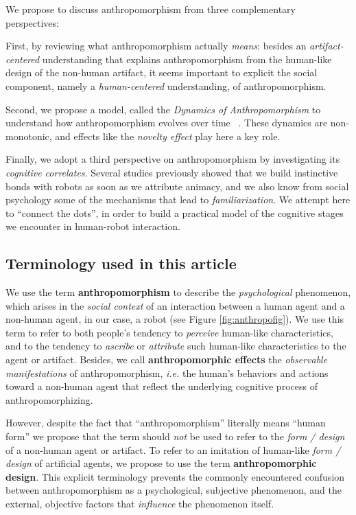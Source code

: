 \documentclass{frontiersSCNS} %
\newcommand{\ie}{\textit{i.e.}\xspace}
\begin{document}
We propose to discuss anthropomorphism from three complementary perspectives: 

First, by reviewing what anthropomorphism actually \emph{means}: besides an
\emph{artifact-centered} understanding that explains anthropomorphism from the
human-like design of the non-human artifact, it seems important to explicit the
social component, namely a \emph{human-centered} understanding, of
anthropomorphism.

Second, we propose a model, called the \textit{Dynamics of Anthropomorphism} to
understand how anthropomorphism evolves over time
~\citep{lemaignan2014dynamics}.  These dynamics are non-monotonic, and effects
like the \emph{novelty effect} play here a key role.

Finally, we adopt a third perspective on anthropomorphism by investigating its
\emph{cognitive correlates}. Several studies previously showed that we build
instinctive bonds with robots as soon as we attribute animacy, and we also know
from social psychology some of the mechanisms that lead to
\emph{familiarization}. We attempt here to ``connect the dots'', in order to
build a practical model of the cognitive stages we encounter in human-robot
interaction.


\subsection{Terminology used in this article}

We use the term \textbf{anthropomorphism} to describe the \emph{psychological}
phenomenon, which arises in the \emph{social context} of an interaction between
a human agent and a non-human agent, in our case, a robot (see Figure
\ref{fig:anthropofig}). We use this term to refer to both people's tendency to
\textit{perceive} human-like characteristics, and to the tendency to
\textit{ascribe} or \textit{attribute} such human-like characteristics to the
agent or artifact. Besides, we call {\bf anthropomorphic effects} the
\emph{observable manifestations} of anthropomorphism, \ie the human's behaviors
and actions toward a non-human agent that reflect the underlying cognitive
process of anthropomorphizing.

However, despite the fact that ``anthropomorphism'' literally means ``human
form'' we propose that the term should \textit{not} be used to refer to the
\textit{form / design} of a non-human agent or artifact. To refer to an
imitation of human-like \textit{form / design} of artificial agents, we propose
to use the term \textbf{anthropomorphic design}. This explicit terminology
prevents the commonly encountered confusion between anthropomorphism as a
psychological, subjective phenomenon, and the external, objective factors that
\emph{influence} the phenomenon itself.
\end{document}
